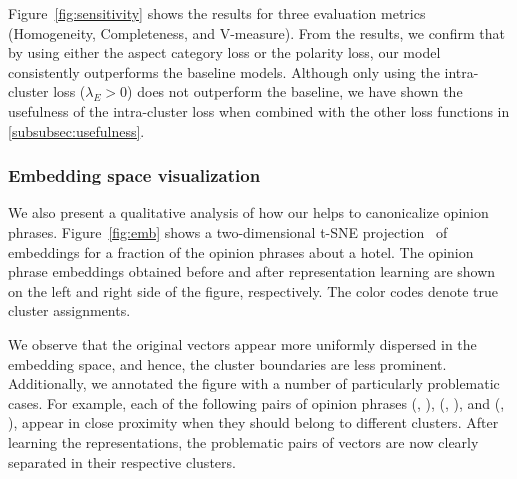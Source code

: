 Figure~\ref{fig:sensitivity} shows the results for three evaluation metrics (Homogeneity, Completeness, and V-measure). From the results, we confirm that by using either the aspect category loss or the polarity loss, our model consistently outperforms the baseline models. 
Although only using the intra-cluster loss ($\lambda_E > 0$) does not outperform the baseline, we have shown the usefulness of the intra-cluster loss when combined with the other loss functions in \ref{subsubsec:usefulness}.


\begin{figure*}[t]%
     \label{fig:emb:before}
    \hfill
    \caption{Embedding space comparison. Color-coding denotes true cluster assignments. After learning representations, semantically similar opinion phrases are significantly closer to each other and irrelevant ones are further apart in the embedding space, allowing easier opinion phrase canonicalization.}%
    \label{fig:emb}%
    \vspace{-4mm}
\end{figure*}

\subsubsection{Embedding space visualization}
We also present a qualitative analysis of how our \canonical{} helps to canonicalize opinion phrases. Figure~\ref{fig:emb} shows a two-dimensional t-SNE projection~\cite{maaten2008visualizing} of embeddings for a fraction of the opinion phrases about a hotel. The opinion phrase embeddings obtained before and after representation learning are shown on the left and right side of the figure, respectively. The color codes denote true cluster assignments. 

We observe that the original vectors appear more uniformly dispersed in the embedding space, and hence, the cluster boundaries are less prominent. Additionally, we annotated the figure with a number of particularly problematic cases. For example, each of the following pairs of opinion phrases (, ), (, ), and (, ), appear in close proximity when they should belong to different clusters. After learning the representations, the problematic pairs of vectors are now clearly separated in their respective clusters.



